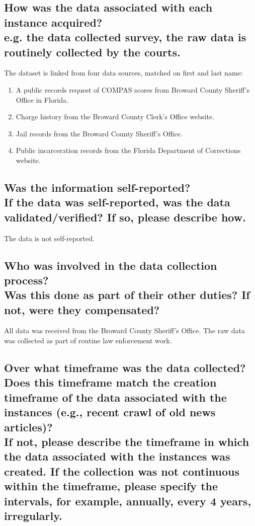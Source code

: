 \documentclass[letterpaper, 10 pt, conference]{ieeeconf}  %
\newcommand{\subtitle}[1]{{\\ \small \normalfont \color{purple} #1}}
\begin{document}
\subsection{How was the data associated with each instance acquired? \subtitle {e.g. the data collected survey, the raw data is routinely collected by the courts.}}

The dataset is linked from four data sources, matched on first and last name:
\begin{enumerate}
    \item A public records request of COMPAS scores from Broward County Sheriff’s Office in Florida.
    \item Charge history from the Broward County Clerk’s Office website.
    \item Jail records from the Broward County Sheriff’s Office.
    \item Public incarceration records from the Florida Department of Corrections website.
\end{enumerate}

\subsection{Was the information self-reported? \subtitle{If the data was self-reported, was the data validated/verified? If so, please describe how.}}

The data is not self-reported.

\subsection{Who was involved in the data collection process? \subtitle{Was this done as part of their other duties? If not, were they compensated?}}

All data was received from the Broward County Sheriff’s Office. The raw data was collected as part of routine law enforcement work. 

\subsection{Over what timeframe was the data collected? Does this timeframe match the creation timeframe of the data associated with the instances (e.g., recent crawl of old news articles)? \subtitle{If not, please describe the timeframe in which the data associated with the instances was created. If the collection was not continuous within the timeframe, please specify the intervals, for example, annually, every 4 years, irregularly.}}
\end{document}
